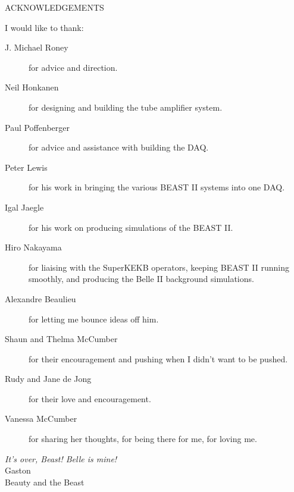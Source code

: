 \newpage
{}

\begin{center}
ACKNOWLEDGEMENTS
\end{center}

\noindent I would like to thank:
\begin{description}
\item[J. Michael Roney]
	for advice and direction.
\item[Neil Honkanen]
	for designing and building the \he tube amplifier system.
\item[Paul Poffenberger]
	for advice and assistance with building the DAQ.
\item[Peter Lewis]
	for his work in bringing the various BEAST II systems into one DAQ.
\item[Igal Jaegle]
	for his work on producing simulations of the BEAST II.
\item[Hiro Nakayama]
	for liaising with the SuperKEKB operators,
	keeping BEAST II running smoothly,
	and producing the Belle II background simulations.
\item[Alexandre Beaulieu]
	for letting me bounce ideas off him.
\item[Shaun and Thelma McCumber]
	for their encouragement and pushing when I didn't want to be pushed.
\item[Rudy and Jane de Jong]
	for their love and encouragement.
\item[Vanessa McCumber]
	for sharing her thoughts,
	for being there for me,
	for loving me.
\end{description}

\begin{flushright}
\textit{It's over, Beast! Belle is mine!}
\\
Gaston \\
Beauty and the Beast\\
\end{flushright}
